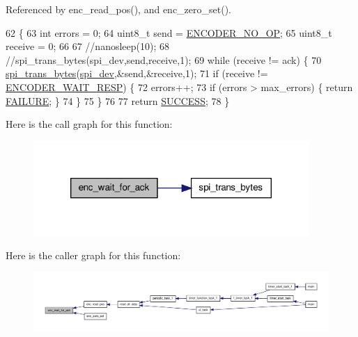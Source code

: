 Referenced by enc\-\_\-read\-\_\-pos(), and enc\-\_\-zero\-\_\-set().


\begin{DoxyCode}
62 \{
63     \textcolor{keywordtype}{int} errors = 0;
64     uint8\_t send = \hyperlink{encoder__functions_8h_ac10b0f18ed2164776ad6843aa7908592}{ENCODER\_NO\_OP};
65     uint8\_t receive = 0;
66         
67   \textcolor{comment}{//nanosleep(10);}
68         \textcolor{comment}{//spi\_trans\_bytes(spi\_dev,send,receive,1);}
69     \textcolor{keywordflow}{while} (receive != ack) \{
70         \hyperlink{communication_2spi__functions_8c_a3ae450d2b3ece27bb6036f811a7625a9}{spi\_trans\_bytes}(\hyperlink{CommunicationV0_2communication_8c_a4788f0a5355494bc6c13690e28f43783}{spi\_dev},&send,&receive,1);
71         \textcolor{keywordflow}{if} (receive != \hyperlink{encoder__functions_8h_a77c3a97f7312d858d04ec3b4e1fb2176}{ENCODER\_WAIT\_RESP}) \{
72             errors++;
73             \textcolor{keywordflow}{if} (errors > max\_errors) \{ \textcolor{keywordflow}{return} \hyperlink{calibration_2calibration_8h_a6d58f9ac447476b4e084d7ca383f5183}{FAILURE}; \}
74         \}
75     \}
76 
77     \textcolor{keywordflow}{return} \hyperlink{calibration_2calibration_8h_aa90cac659d18e8ef6294c7ae337f6b58}{SUCCESS};
78 \}
\end{DoxyCode}


Here is the call graph for this function\-:\nopagebreak
\begin{figure}[H]
\begin{center}
\leavevmode
\includegraphics[width=296pt]{group__enc_gad82fb44f2e735628ec95e003e4a1f93c_cgraph}
\end{center}
\end{figure}




Here is the caller graph for this function\-:
\nopagebreak
\begin{figure}[H]
\begin{center}
\leavevmode
\includegraphics[width=350pt]{group__enc_gad82fb44f2e735628ec95e003e4a1f93c_icgraph}
\end{center}
\end{figure}



